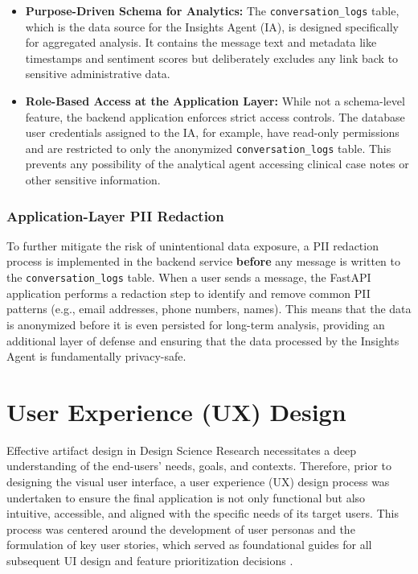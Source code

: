 \begin{itemize}
    \item \textbf{Purpose-Driven Schema for Analytics:} The \texttt{conversation\_logs} table, which is the data source for the Insights Agent (IA), is designed specifically for aggregated analysis. It contains the message text and metadata like timestamps and sentiment scores but deliberately excludes any link back to sensitive administrative data.
    \item \textbf{Role-Based Access at the Application Layer:} While not a schema-level feature, the backend application enforces strict access controls. The database user credentials assigned to the IA, for example, have read-only permissions and are restricted to only the anonymized \texttt{conversation\_logs} table. This prevents any possibility of the analytical agent accessing clinical case notes or other sensitive information.
\end{itemize}

\subsubsection{Application-Layer PII Redaction}
To further mitigate the risk of unintentional data exposure, a PII redaction process is implemented in the backend service \textbf{before} any message is written to the \texttt{conversation\_logs} table. When a user sends a message, the FastAPI application performs a redaction step to identify and remove common PII patterns (e.g., email addresses, phone numbers, names). This means that the data is anonymized before it is even persisted for long-term analysis, providing an additional layer of defense and ensuring that the data processed by the Insights Agent is fundamentally privacy-safe.


\section{User Experience (UX) Design}

Effective artifact design in Design Science Research necessitates a deep understanding of the end-users' needs, goals, and contexts. Therefore, prior to designing the visual user interface, a user experience (UX) design process was undertaken to ensure the final application is not only functional but also intuitive, accessible, and aligned with the specific needs of its target users. This process was centered around the development of user personas and the formulation of key user stories, which served as foundational guides for all subsequent UI design and feature prioritization decisions \cite{FIND_CITATION_HERE}.

